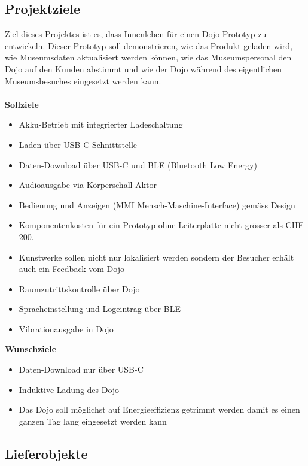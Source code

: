 \documentclass[10pt,a4paper,oneside]{99_fhnwreport}
\begin{document}
\subsection{Projektziele}
Ziel dieses Projektes ist es, dass Innenleben für einen Dojo-Prototyp zu entwickeln. Dieser Prototyp soll demonstrieren, wie das Produkt geladen wird, wie Museumsdaten aktualisiert werden können, wie das Museumspersonal den Dojo auf den Kunden abstimmt und wie der Dojo während des eigentlichen Museumsbesuches eingesetzt werden kann.\\
\\
\textbf{Sollziele}
\begin{itemize}
\item{Akku-Betrieb mit integrierter Ladeschaltung}
\item{Laden über USB-C Schnittstelle}
\item{Daten-Download über USB-C und BLE (Bluetooth Low Energy)}
\item{Audioausgabe via Körperschall-Aktor}
\item{Bedienung und Anzeigen (MMI  Mensch-Maschine-Interface) gemäss Design}
\item{Komponentenkosten für ein Prototyp ohne Leiterplatte nicht grösser als CHF 200.- }
\item{Kunstwerke sollen nicht nur lokalisiert werden sondern der Besucher erhält auch ein Feedback vom Dojo}
\item{Raumzutrittskontrolle über Dojo}
\item{Spracheinstellung und Logeintrag über BLE}
\item{Vibrationausgabe in Dojo}
\end{itemize}

\textbf{Wunschziele}
\begin{itemize}
\item{Daten-Download nur über USB-C}
\item{Induktive Ladung des Dojo}
\item{Das Dojo soll möglichst auf Energieeffizienz getrimmt werden damit es einen ganzen Tag lang eingesetzt werden kann}
\end{itemize}

\subsection{Lieferobjekte}
\end{document}

